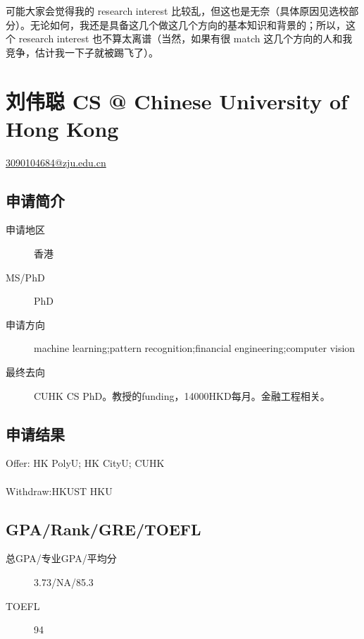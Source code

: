 \documentclass[11pt,fleqn,openany]{book} %
\begin{document}
可能大家会觉得我的 research interest 比较乱，但这也是无奈（具体原因见选校部分）。无论如何，我还是具备这几个做这几个方向的基本知识和背景的；所以，这个 research interest 也不算太离谱（当然，如果有很 match 这几个方向的人和我竞争，估计我一下子就被踢飞了）。
\clearpage
\section{刘伟聪 CS @ Chinese University of Hong Kong}
\hfill \href{mailto:3090104684@zju.edu.cn}{3090104684@zju.edu.cn}

\noindent\begin{minipage}[t]{0.45\textwidth}
\subsection*{申请简介}
\begin{description}
\item[申请地区] 香港
\item[MS/PhD] PhD
\item[申请方向] machine learning;pattern recognition;financial engineering;computer vision
\item[最终去向] CUHK CS PhD。教授的funding，14000HKD每月。金融工程相关。
\end{description}
\end{minipage}
\hfill
\begin{minipage}[t]{0.45\textwidth}
\subsection*{申请结果}
\noindent Offer: HK PolyU; HK CityU; CUHK\\
\\
Withdraw:HKUST HKU
\end{minipage}
\subsection*{GPA/Rank/GRE/TOEFL}
\begin{description}
\item[总GPA/专业GPA/平均分] 3.73/NA/85.3
\item[TOEFL] 94
\end{description}
\end{document}
